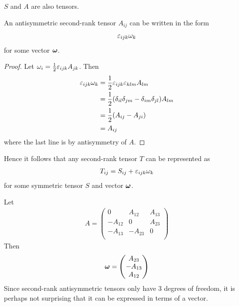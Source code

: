 \documentclass{../../template/note}
\begin{document}
    \begin{remark*}
        \(S\) and \(A\) are also tensors.
    \end{remark*}
    
    \begin{proposition*}
        An antisymmetric second-rank tensor \(A_{ij}\) can be written in the form
        \begin{align*}
            \varepsilon_{ijk}\omega_k
        \end{align*}
        for some vector \(\V \omega\).        
    \end{proposition*}
    
    \begin{proof}
        Let \(\omega_i = \frac 1 2 \varepsilon_{ijk}A_{jk}\). Then
        \begin{align*}
            \varepsilon_{ijk}\omega_k &= \frac 1 2 \varepsilon_{ijk}\varepsilon_{klm}A_{lm} \\
            &= \frac 1 2 (\delta_{il}\delta_{jm}-\delta_{im}\delta_{jl})A_{lm} \\
            &= \frac 1 2 (A_{ij}-A_{ji}) \\
            &= A_{ij}
        \end{align*}
        where the last line is by antisymmetry of \(A\).        
    \end{proof}
    
    Hence it follows that any second-rank tensor \(T\) can be represented as
    \begin{align*}
        T_{ij} = S_{ij}+\varepsilon_{ijk}\omega_k
    \end{align*}
    for some symmetric tensor \(S\) and vector \(\V \omega\).
    
    \begin{remark*}
        Let
        \begin{align*}
            A = \begin{pmatrix}
                0 & A_{12} & A_{13} \\
                -A_{12} & 0 & A_{23} \\
                -A_{13} & -A_{23} & 0 \\
            \end{pmatrix}
        \end{align*}
        Then
        \begin{align*}
            \V \omega = \begin{pmatrix}
                A_{23} \\
                -A_{13} \\
                A_{12} \\
            \end{pmatrix}
        \end{align*}
        Since second-rank antisymmetric tensors only have 3 degrees of freedom, it is perhaps not surprising that it can be expressed in terms of a vector.       
    \end{remark*}
\end{document}
